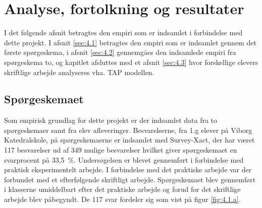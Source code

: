 \chapter{Analyse, fortolkning og resultater}
\label{Ch:4}

I det følgende afsnit betragtes den empiri som er indsamlet i forbindelse med dette projekt.  I afsnit \vref{sec:4.1} betragtes den empiri som er indsamlet gennem det første spørgeskema, i afsnit \vref{sec:4.2} gennemgåes den indsamlede empiri fra spørgeskema to, og kapitlet afsluttes med et afsnit \vref{sec:4.3} hvor forskellige elevers skriftlige arbejde analyseres vha. TAP modellen.

\section{Spørgeskemaet}
\label{sec:4.1}
Som empirisk grundlag for dette projekt er der indsamlet data fra to spørgeskemaer samt fra elev afleveringer.  Besvarelserne, fra 1.g elever på Viborg Katedralskole, på spørgeskemaerne er indsamlet med Survey-Xact, der har været 117 besvarelser ud af 349 mulige besvarelser hvilket giver spørgeskemaet en svarprocent på \mbox{33,5 \%}. Undersøgelsen er blevet gennemført i forbindelse med praktisk eksperimentelt arbejde.  I forbindelse med det praktiske arbejde var der forbundet med et efterfølgende skriftligt arbejde. Spørgeskemaet blev gennemført i klasserne umiddelbart efter det praktiske arbejde og forud for det skriftlige arbejde blev påbegyndt. De 117 svar fordeler sig som vist på figur \vref{fig:4.1.a}. 

